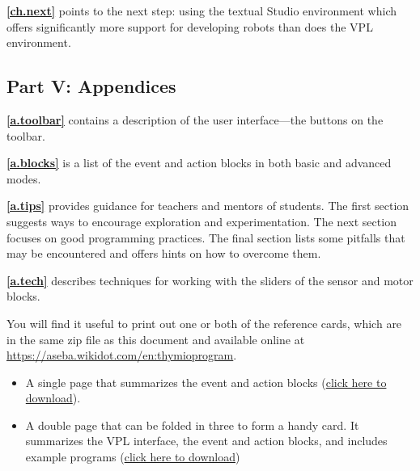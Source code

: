 \textbf{\cref{ch.next}} points to the next step: using the
textual Studio environment which offers significantly more support for
developing robots than does the VPL environment.


\subsection*{Part V: Appendices}

\textbf{\cref{a.toolbar}} contains a description of the user
interface---the buttons on the toolbar.

\textbf{\cref{a.blocks}} is a list of the event and
action blocks in both basic and advanced modes.

\textbf{\cref{a.tips}} provides guidance for teachers and
mentors of students. The first section suggests ways to encourage
exploration and experimentation. The next section focuses on good
programming practices. The final section lists some pitfalls that may be
encountered and offers hints on how to overcome them.

\textbf{\cref{a.tech}} describes techniques for working with the
sliders of the sensor and motor blocks.

 \quad {}



You will find it useful to print out one or both of the reference cards,
which are in the same zip file as this document and available
online at \url{https://aseba.wikidot.com/en:thymioprogram}.

\begin{itemize}
\item A single page that summarizes the event and action blocks
(\href{https://aseba.wdfiles.com/local--files/en:thymioprogram/thymio-vpl-ref-card-en.pdf}{click here to download}).
\item A double page that can be folded in three to form a handy card.
It summarizes the VPL interface, the event and action blocks,
and includes example programs
(\href{https://aseba.wdfiles.com/local--files/en:thymioprogram/thymio-vpl-folding-ref-card-en.pdf}{click here to download})
\end{itemize}
